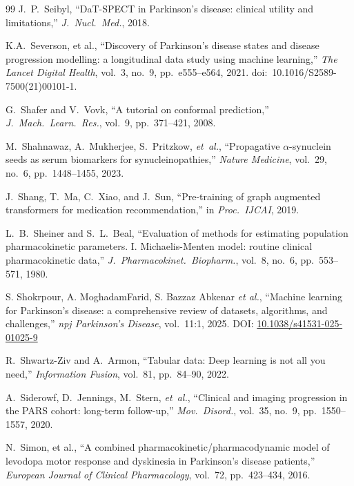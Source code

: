 \begin{thebibliography}{99}
J.~P.~Seibyl, ``DaT-SPECT in Parkinson's disease: clinical utility and limitations,'' \textit{J.\ Nucl.\ Med.}, 2018.

K.A.~Severson, et al., ``Discovery of Parkinson's disease states and disease progression modelling: a longitudinal data study using machine learning,'' \textit{The Lancet Digital Health}, vol.~3, no.~9, pp.~e555--e564, 2021. doi:~10.1016/S2589-7500(21)00101-1.

G.~Shafer and V.~Vovk, ``A tutorial on conformal prediction,'' \textit{J.\ Mach.\ Learn.\ Res.}, vol.~9, pp.~371--421, 2008.

M.~Shahnawaz, A.~Mukherjee, S.~Pritzkow, \textit{et~al.}, ``Propagative $\alpha$-synuclein seeds as serum biomarkers for synucleinopathies,'' \textit{Nature Medicine}, vol.~29, no.~6, pp.~1448--1455, 2023.

J.~Shang, T.~Ma, C.~Xiao, and J.~Sun, ``Pre-training of graph augmented transformers for medication recommendation,'' in \textit{Proc.\ IJCAI}, 2019.

L.~B.~Sheiner and S.~L.~Beal, ``Evaluation of methods for estimating population pharmacokinetic parameters. I. Michaelis-Menten model: routine clinical pharmacokinetic data,'' \textit{J.\ Pharmacokinet.\ Biopharm.}, vol.~8, no.~6, pp.~553--571, 1980.

S. Shokrpour, A. MoghadamFarid, S. Bazzaz Abkenar \textit{et al.},
``Machine learning for Parkinson's disease: a comprehensive review of datasets, algorithms, and challenges,''
\textit{npj Parkinson's Disease}, vol.~11:1, 2025. DOI: \href{https://doi.org/10.1038/s41531-025-01025-9}{10.1038/s41531-025-01025-9}

R.~Shwartz-Ziv and A.~Armon, ``Tabular data: Deep learning is not all you need,'' \textit{Information Fusion}, vol.~81, pp.~84--90, 2022.

A.~Siderowf, D.~Jennings, M.~Stern, \textit{et~al.}, ``Clinical and imaging progression in the PARS cohort: long-term follow-up,'' \textit{Mov.\ Disord.}, vol.~35, no.~9, pp.~1550--1557, 2020.

N.~Simon, et al., ``A combined pharmacokinetic/pharmacodynamic model of levodopa motor response and dyskinesia in Parkinson's disease patients,'' \textit{European Journal of Clinical Pharmacology}, vol.~72, pp.~423--434, 2016.


\end{thebibliography}

